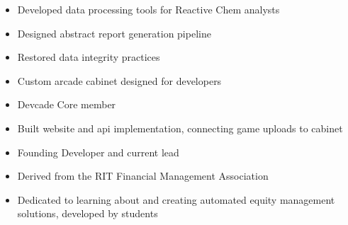 \documentclass[10pt,a4paper,ragged2e,withhyper]{altacv}
\begin{document}
\begin{paracol}{2}


\begin{itemize}
    \item Developed data processing tools for Reactive Chem analysts
    \item Designed abstract report generation pipeline
    \item Restored data integrity practices
\end{itemize}

\divider


\divider



\begin{itemize}
    \item Custom arcade cabinet designed for developers
    \item Devcade Core member
    \item Built website and api implementation, connecting game uploads to cabinet
\end{itemize}\par


\divider

\begin{itemize}
    \item Founding Developer and current lead
    \item Derived from the RIT Financial Management Association
    \item Dedicated to learning about and creating automated equity management solutions, developed by students
\end{itemize}

\divider


\end{paracol}
\end{document}
